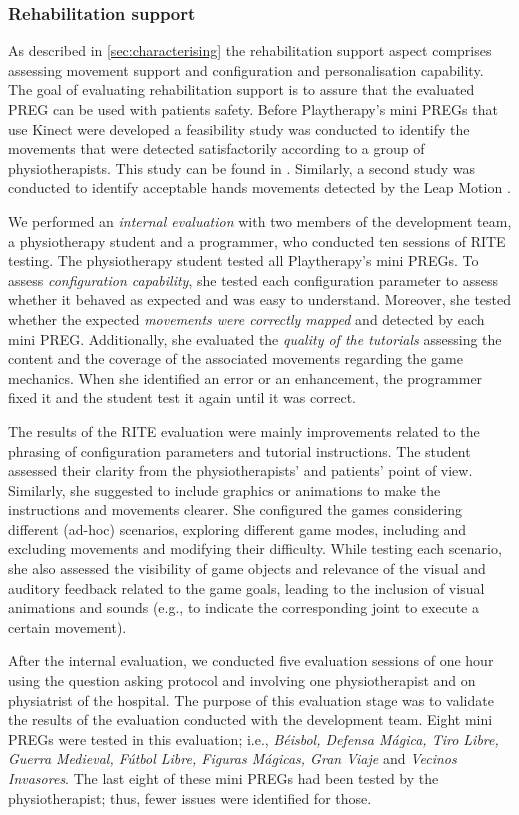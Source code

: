 \subsubsection{Rehabilitation support}
As described in \autoref{sec:characterising} the rehabilitation support aspect comprises assessing movement support and configuration and personalisation capability. The goal of evaluating rehabilitation support is to assure that the evaluated \ac{PREG} can be used with patients safety. Before Playtherapy's mini \acp{PREG} that use Kinect were developed a feasibility study was conducted to identify the movements that were detected satisfactorily according to a group of physiotherapists. This study can be found in \autocite{Prado2018}. Similarly, a second study was conducted to identify acceptable hands movements detected by the Leap Motion \autocite{Lopez2017}.


We performed an \emph{internal evaluation} with two members of the development team, a physiotherapy student and a programmer, who conducted ten sessions of \ac{RITE} testing. The physiotherapy student tested all Playtherapy's mini \acp{PREG}. To assess \textit{configuration capability}, she tested each configuration parameter to assess whether it behaved as expected and was easy to understand. Moreover, she tested whether the expected \textit{movements were correctly mapped} and detected by each mini \ac{PREG}. Additionally, she evaluated the \textit{quality of the tutorials} assessing the content and the coverage of the associated movements regarding the game mechanics. When she identified an error or an enhancement, the programmer fixed it and the student test it again until it was correct.

The results of the \ac{RITE} evaluation were mainly improvements related to the phrasing of configuration parameters and tutorial instructions. The student assessed their clarity from the physiotherapists' and patients' point of view. Similarly, she suggested to include graphics or animations to make the instructions and movements clearer. She configured the games considering different (ad-hoc) scenarios, exploring different game modes, including and excluding movements and modifying their difficulty. While testing each scenario, she also assessed the visibility of game objects and relevance of the visual and auditory feedback related to the game goals, leading to the inclusion of visual animations and sounds (e.g., to indicate the corresponding joint to execute a certain movement).

After the internal evaluation, we conducted five evaluation sessions of one hour using the question asking protocol and involving one physiotherapist and on physiatrist of the hospital. The purpose of this evaluation stage was to validate the results of the evaluation conducted with the development team. Eight mini \acp{PREG} were tested in this evaluation; i.e., \textit{Béisbol, Defensa M\'agica, Tiro Libre, Guerra Medieval, F\'utbol Libre, Figuras Mágicas, Gran Viaje} and \textit{Vecinos Invasores}. The last eight of these mini \acp{PREG} had been tested by the physiotherapist; thus, fewer issues were identified for those.

